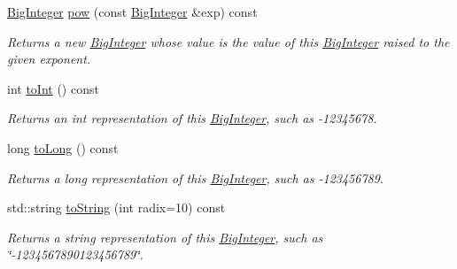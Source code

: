 \begin{DoxyCompactItemize}
\mbox{\hyperlink{classBigInteger}{Big\+Integer}} \mbox{\hyperlink{classBigInteger_af004e9189931255ce5d71f55d4ab4976}{pow}} (const \mbox{\hyperlink{classBigInteger}{Big\+Integer}} \&exp) const
\begin{DoxyCompactList}\small\item\em Returns a new \mbox{\hyperlink{classBigInteger}{Big\+Integer}} whose value is the value of this \mbox{\hyperlink{classBigInteger}{Big\+Integer}} raised to the given exponent. \end{DoxyCompactList}\item 
int \mbox{\hyperlink{classBigInteger_a8cc7782de081ce702a9be163b4cb8f84}{to\+Int}} () const
\begin{DoxyCompactList}\small\item\em Returns an int representation of this \mbox{\hyperlink{classBigInteger}{Big\+Integer}}, such as -\/12345678. \end{DoxyCompactList}\item 
long \mbox{\hyperlink{classBigInteger_aa762dbabd60643be2be9aa9eb14deddb}{to\+Long}} () const
\begin{DoxyCompactList}\small\item\em Returns a long representation of this \mbox{\hyperlink{classBigInteger}{Big\+Integer}}, such as -\/123456789. \end{DoxyCompactList}\item 
std\+::string \mbox{\hyperlink{classBigInteger_a23af335cf9a414459a10205e2031c182}{to\+String}} (int radix=10) const
\begin{DoxyCompactList}\small\item\em Returns a string representation of this \mbox{\hyperlink{classBigInteger}{Big\+Integer}}, such as \char`\"{}-\/1234567890123456789\char`\"{}. \end{DoxyCompactList}\end{DoxyCompactItemize}
